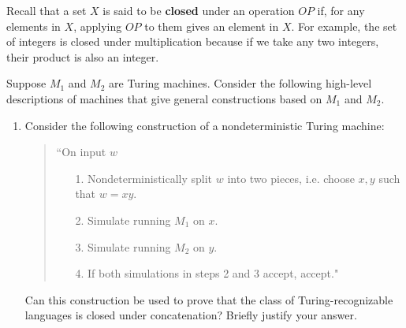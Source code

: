 \documentclass[12pt, oneside]{article}
\begin{document}
\begin{enumerate}
    Recall that a set $X$ is said to be {\bf closed} under an operation $OP$ if, for any elements in $X$, applying 
    $OP$ to them gives an element in $X$.  For example, the set of integers is closed under multiplication
    because if we take any two integers, their product is also an integer.
    
    Suppose $M_1$  and $M_2$ are Turing machines.  Consider the following high-level  
    descriptions of machines that give general constructions based on  $M_1$  and $M_2$.
    
    \begin{enumerate}
    \item Consider the  following construction of a nondeterministic  Turing  machine:
    \begin{quote}
    ``On  input $w$
    \begin{itemize}
    \item[1.] Nondeterministically  split $w$ into two pieces, i.e. choose  $x,y$  such that  $w =  xy$.
    \item[2.] Simulate running $M_1$ on  $x$.
    \item[3.] Simulate running $M_2$ on  $y$.
    \item[4.] If both simulations in steps 2 and 3 accept, accept."
    \end{itemize}
    \end{quote}
    
    Can  this construction  be  used  to prove that the class  of  Turing-recognizable languages is closed under 
    concatenation? Briefly  justify your  answer.
    

\end{enumerate}
\end{enumerate}
\end{document}
